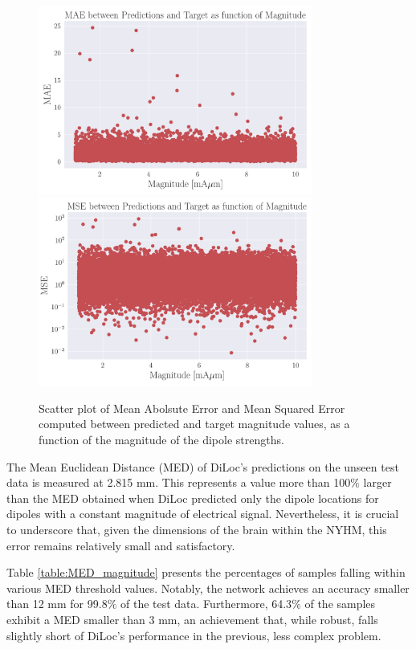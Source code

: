 \documentclass[a4paper, UKenglish, 11pt]{uiomaster}
\begin{document}
\begin{figure}
  \hspace*{-3cm} %
  \includegraphics[width=9cm]{figures/mae_amplitude.pdf}
  \includegraphics[width=9cm]{figures/mse_amplitude.pdf}
  \caption{Scatter plot of Mean Abolsute Error and Mean Squared Error computed between predicted and target magnitude values, as a function of the magnitude of the dipole strengths.}
  \label{fig:magnitude_errors}
\end{figure}

The Mean Euclidean Distance (MED) of DiLoc's predictions on the unseen test data is measured at 2.815 mm. This represents a value more than 100$\%$ larger than the MED obtained when DiLoc predicted only the dipole locations for dipoles with a constant magnitude of electrical signal. Nevertheless, it is crucial to underscore that, given the dimensions of the brain within the NYHM, this error remains relatively small and satisfactory.

Table \ref{table:MED_magnitude} presents the percentages of samples falling within various MED threshold values. Notably, the network achieves an accuracy smaller than 12 mm for 99.8$\%$ of the test data. Furthermore, 64.3$\%$ of the samples exhibit a MED smaller than 3 mm, an achievement that, while robust, falls slightly short of DiLoc's performance in the previous, less complex problem.
\end{document}
